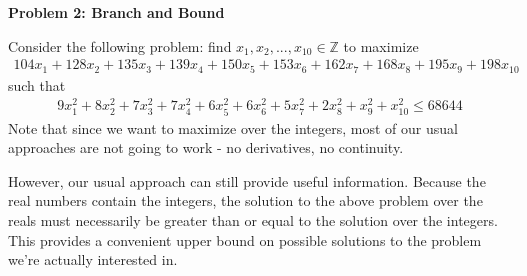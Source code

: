 \documentclass[11pt,letterpaper]{article}
\begin{document}
\textbf{\large Problem 2: Branch and Bound}
\begin{flushleft}
    \justifying
    Consider the following problem: find $x_1 , x_2 , . . . , x_10 \in \mathbb{Z}$ to maximize
    \begin{align}
        104x_1 + 128x_2 + 135x_3 + 139x_4 + 150x_5 + 153x_6 + 162x_7 + 168x_8 + 195x_9 + 198x_{10}
    \end{align}
    such that
    \begin{align}
        9x^2_1 +8x^2_2 +7x^2_3 +7x^2_4 +6x^2_5 +6x^2_6 +5x^2_7 +2x^2_8 +x^2_9 +x^2_{10} \leq 68644
    \end{align}
    Note that since we want to maximize over the integers, most of our usual approaches are not going to work - no
    derivatives, no continuity.
\end{flushleft}
\begin{flushleft}
    However, our usual approach can still provide useful information. Because the real numbers contain the integers, the solution to the above problem over the reals must necessarily be greater than or equal to the solution over the integers. This provides a convenient upper bound on possible solutions to the problem we’re actually interested in.
\end{flushleft}
\end{document}
